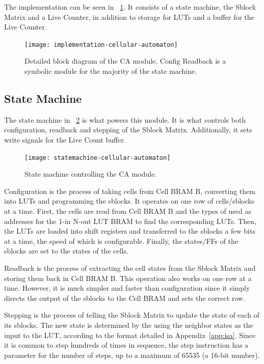 The implementation can be seen in \figurename~\ref{fig:implementation-cellular-automaton}.
It consists of a state machine, the Sblock Matrix and a Live Counter, in addition to storage for LUTs and a buffer for the Live Counter.

\begin{figure}[!ht]
    \centering
    \texttt{[image: implementation-cellular-automaton]}
    \caption[CA module]{
        Detailed block diagram of the CA module.
        Config Readback is a symbolic module for the majority of the state machine.
    }
    \label{fig:implementation-cellular-automaton}
\end{figure}

\subsection{State Machine}

The state machine in \figurename~\ref{fig:statemachine-cellular-automaton} is what powers this module.
It is what controls both configuration, readback and stepping of the Sblock Matrix.
Additionally, it sets write signals for the Live Count buffer.

\begin{figure}[!ht]
    \centering
    \texttt{[image: statemachine-cellular-automaton]}
    \caption[CA module state machine]{
        State machine controlling the CA module.
    }
    \label{fig:statemachine-cellular-automaton}
\end{figure}

Configuration is the process of taking cells from Cell BRAM B, converting them into LUTs and programming the sblocks.
It operates on one row of cells/sblocks at a time.
First, the cells are read from Cell BRAM B and the types of used as addresses for the 1-in N-out LUT BRAM to find the corresponding LUTs.
Then, the LUTs are loaded into shift registers and transferred to the sblocks a few bits at a time, the speed of which is configurable.
Finally, the states/FFs of the sblocks are set to the states of the cells.

Readback is the process of extracting the cell states from the Sblock Matrix and storing them back in Cell BRAM B.
This operation also works on one row at a time.
However, it is much simpler and faster than configuration since it simply directs the output of the sblocks to the Cell BRAM and sets the correct row.

Stepping is the process of telling the Sblock Matrix to update the state of each of its sblocks.
The new state is determined by the using the neighbor states as the input to the LUT, according to the format detailed in Appendix~\ref{app:isa}.
Since it is common to step hundreds of times in sequence, the step instruction has a parameter for the number of steps, up to a maximum of 65535 (a 16-bit number).

